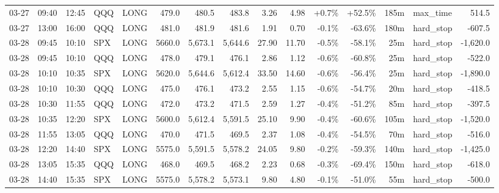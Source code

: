 \documentclass[11pt,a4paper,twoside]{article}
\begin{document}
\begin{landscape}
\begin{center}
\begin{longtable}{>{\color{txtmain}}l l l l l r r r r r r r r >{\color{txtmain}}l r}
03-27 & 09:40 & 12:45 & QQQ & LONG & 479.0 & 480.5 & 483.8 & 3.26 & 4.98 & \textcolor{wingreen}{+0.7\%} & \textcolor{wingreen}{+52.5\%} & 185m & max\_time & \textcolor{wingreen}{514.5} \\
03-27 & 13:00 & 16:00 & QQQ & LONG & 481.0 & 481.9 & 481.6 & 1.91 & 0.70 & \textcolor{lossred}{-0.1\%} & \textcolor{lossred}{-63.6\%} & 180m & hard\_stop & \textcolor{lossred}{-607.5} \\
03-28 & 09:45 & 10:10 & SPX & LONG & 5660.0 & 5,673.1 & 5,644.6 & 27.90 & 11.70 & \textcolor{lossred}{-0.5\%} & \textcolor{lossred}{-58.1\%} & 25m & hard\_stop & \textcolor{lossred}{-1,620.0} \\
03-28 & 09:45 & 10:10 & QQQ & LONG & 478.0 & 479.1 & 476.1 & 2.86 & 1.12 & \textcolor{lossred}{-0.6\%} & \textcolor{lossred}{-60.8\%} & 25m & hard\_stop & \textcolor{lossred}{-522.0} \\
03-28 & 10:10 & 10:35 & SPX & LONG & 5620.0 & 5,644.6 & 5,612.4 & 33.50 & 14.60 & \textcolor{lossred}{-0.6\%} & \textcolor{lossred}{-56.4\%} & 25m & hard\_stop & \textcolor{lossred}{-1,890.0} \\
03-28 & 10:10 & 10:30 & QQQ & LONG & 475.0 & 476.1 & 473.2 & 2.55 & 1.15 & \textcolor{lossred}{-0.6\%} & \textcolor{lossred}{-54.7\%} & 20m & hard\_stop & \textcolor{lossred}{-418.5} \\
03-28 & 10:30 & 11:55 & QQQ & LONG & 472.0 & 473.2 & 471.5 & 2.59 & 1.27 & \textcolor{lossred}{-0.4\%} & \textcolor{lossred}{-51.2\%} & 85m & hard\_stop & \textcolor{lossred}{-397.5} \\
03-28 & 10:35 & 12:20 & SPX & LONG & 5600.0 & 5,612.4 & 5,591.5 & 25.10 & 9.90 & \textcolor{lossred}{-0.4\%} & \textcolor{lossred}{-60.6\%} & 105m & hard\_stop & \textcolor{lossred}{-1,520.0} \\
03-28 & 11:55 & 13:05 & QQQ & LONG & 470.0 & 471.5 & 469.5 & 2.37 & 1.08 & \textcolor{lossred}{-0.4\%} & \textcolor{lossred}{-54.5\%} & 70m & hard\_stop & \textcolor{lossred}{-516.0} \\
03-28 & 12:20 & 14:40 & SPX & LONG & 5575.0 & 5,591.5 & 5,578.2 & 24.05 & 9.80 & \textcolor{lossred}{-0.2\%} & \textcolor{lossred}{-59.3\%} & 140m & hard\_stop & \textcolor{lossred}{-1,425.0} \\
03-28 & 13:05 & 15:35 & QQQ & LONG & 468.0 & 469.5 & 468.2 & 2.23 & 0.68 & \textcolor{lossred}{-0.3\%} & \textcolor{lossred}{-69.4\%} & 150m & hard\_stop & \textcolor{lossred}{-618.0} \\
03-28 & 14:40 & 15:35 & SPX & LONG & 5575.0 & 5,578.2 & 5,573.1 & 9.80 & 4.80 & \textcolor{lossred}{-0.1\%} & \textcolor{lossred}{-51.0\%} & 55m & hard\_stop & \textcolor{lossred}{-500.0} \\

\end{longtable}
\end{center}
\end{landscape}
\end{document}
